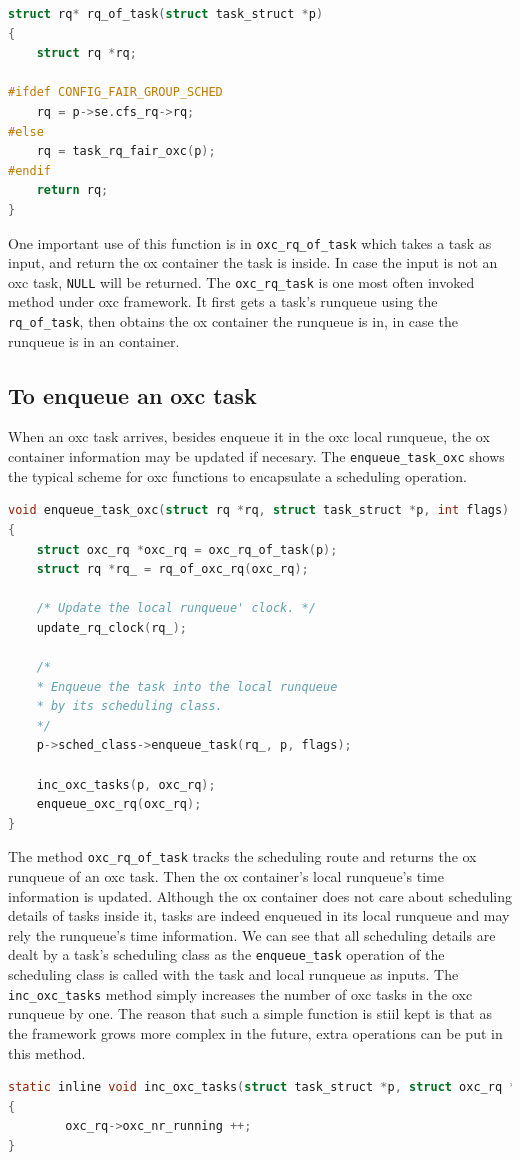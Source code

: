 \begin{lstlisting}[language=C, 
		caption={Codes to obtain the runqueue of a task},
			label={rq_of_task}]
struct rq* rq_of_task(struct task_struct *p)
{
	struct rq *rq;

#ifdef CONFIG_FAIR_GROUP_SCHED
	rq = p->se.cfs_rq->rq;
#else
	rq = task_rq_fair_oxc(p);
#endif
	return rq;
}
\end{lstlisting}
One important
use of this function is in \texttt{oxc\_rq\_of\_task} which takes a task
as input, and return the ox container the task is inside. In case the input 
is not an oxc task, \texttt{NULL} will be returned. The \texttt{oxc\_rq\_task}
is one most often invoked method under oxc framework. It first gets a task's
runqueue using the \texttt{rq\_of\_task}, then obtains the ox container the
runqueue is in, in case the runqueue is in an container.

\subsection{To enqueue an oxc task}
When an oxc task arrives, besides enqueue it in the oxc local runqueue,
the ox container information may be updated if necesary.
The \texttt{enqueue\_task\_oxc} shows the typical scheme for oxc functions
to encapsulate a scheduling operation.
\begin{lstlisting}[language=C, 
		caption={To enqueue an task into the oxc local runqueue} ]
void enqueue_task_oxc(struct rq *rq, struct task_struct *p, int flags)
{
	struct oxc_rq *oxc_rq = oxc_rq_of_task(p);
	struct rq *rq_ = rq_of_oxc_rq(oxc_rq);

	/* Update the local runqueue' clock. */
	update_rq_clock(rq_);

	/*	
	* Enqueue the task into the local runqueue
	* by its scheduling class.
	*/
	p->sched_class->enqueue_task(rq_, p, flags);

	inc_oxc_tasks(p, oxc_rq);
	enqueue_oxc_rq(oxc_rq);
}
\end{lstlisting}
The method \texttt{oxc\_rq\_of\_task} tracks the scheduling route and 
returns the ox runqueue of an oxc task. Then the ox container's local 
runqueue's time information is updated. Although the ox container does 
not care about scheduling details of tasks inside it, tasks are indeed 
enqueued in its local runqueue and may rely the runqueue's time information. 
We can see that all scheduling details are dealt by a task's scheduling class 
as the \texttt{enqueue\_task} operation of the scheduling class is called with 
the task and local runqueue as inputs. The \texttt{inc\_oxc\_tasks} method
simply increases the number of oxc tasks in the oxc runqueue by one.
The reason that such a simple function is stiil kept is that as the framework
grows more complex in the future, extra operations can be put in this method.
\begin{lstlisting}[language=C, 
		caption={To update the number of tasks inside a container} ]
static inline void inc_oxc_tasks(struct task_struct *p, struct oxc_rq *oxc_rq)
{
        oxc_rq->oxc_nr_running ++;
}
\end{lstlisting}

